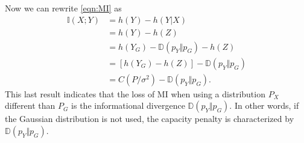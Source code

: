 Now we can rewrite \ref{eqn:MI} as
\begin{align}
	\mathbb{I}(X;Y) &= h(Y) - h(Y \vert X)\\
	& = h(Y) - h(Z)\\
	& = h(Y_G) - \mathbb{D}(p_Y \Vert p_G) - h(Z)\\
	& = [h(Y_G) - h(Z)] - \mathbb{D}(p_Y \Vert p_G)\\
	& = C(P/\sigma^2) - \mathbb{D}(p_Y \Vert p_G).
\label{eq:C_minus_D}
\end{align}
This last result indicates that the loss of MI when using a distribution $P_X$ different than $P_G$ is the informational divergence $\mathbb{D}(p_Y \Vert p_G)$. In other words, if the Gaussian distribution is not used, the capacity penalty is characterized by $\mathbb{D}(p_Y \Vert p_G)$.\\

